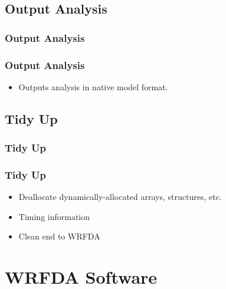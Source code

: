 \documentclass{beamer}
\begin{document}
\subsection{Output Analysis}
\begin{frame}
\frametitle{Output Analysis}
\end{frame}

\begin{frame}
\frametitle{Output Analysis}
\begin{itemize}
\item Outputs analysis in native model format.
\end{itemize}
\end{frame}

\subsection{Tidy Up}

\begin{frame}
\frametitle{Tidy Up}
\end{frame}

\begin{frame}
\frametitle{Tidy Up}
\begin{itemize}
\item Deallocate dynamically-allocated arrays, structures, etc.\pause
\item Timing information \pause
\item Clean end to WRFDA
\end{itemize}
\end{frame}

\section{WRFDA Software}
\end{document}
